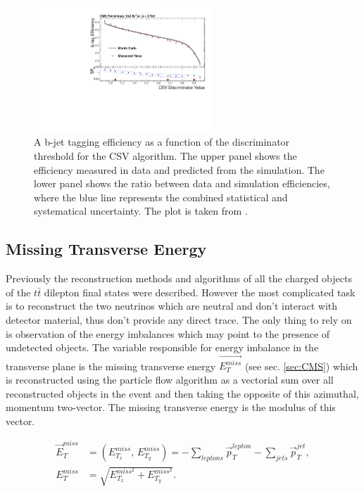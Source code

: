 \begin{figure}[t]
  \centering
  \includegraphics[width=0.6\textwidth]{04_event_reconstruction/plots/Figure_012-b.pdf}
  \caption{A b-jet tagging efficiency as a function of the discriminator threshold for the CSV algorithm. The upper panel shows the efficiency measured in data and predicted from the simulation.
  The lower panel shows the ratio between data and simulation efficiencies, where the blue line represents the combined statistical and systematical uncertainty. The plot is taken from \cite{CMS-PAS-BTV-13-001}.}
  \label{fig:CSVeff}
\end{figure}

\subsection{Missing Transverse Energy}

Previously the reconstruction methods and algorithms of all the charged objects of the $t\bar{t}$ dilepton final states were described. However the most complicated 
task is to reconstruct the two neutrinos which are neutral and don't interact with detector material, thus don't provide any direct trace. The only thing to rely on is
observation of the energy imbalances which may point to the presence of undetected objects. The variable responsible for energy imbalance in the transverse plane is 
the missing transverse energy $\vec{E^{miss}_{T}}$ (see sec. \ref{sec:CMS}) which is reconstructed using the particle flow algorithm \cite{CMS-PAS-PFT-09-001}
as a vectorial sum over all reconstructed objects in the event and then taking the opposite of this azimuthal, momentum two-vector. The missing transverse energy is the modulus
of this vector.

\begin{align}
 \vec{E}_{T}^{miss} & = (E_{T_{x}}^{miss}, \, E_{T_{y}}^{miss}) = - \sum_{leptons} \vec{p}_{T}^{lepton} - \sum_{jets} \vec{p}_{T}^{jet}, \\
 E_{T}^{miss} & = \sqrt{E_{T_{x}}^{miss^{2}} + E_{T_{y}}^{miss^{2}}}.
\end{align}

